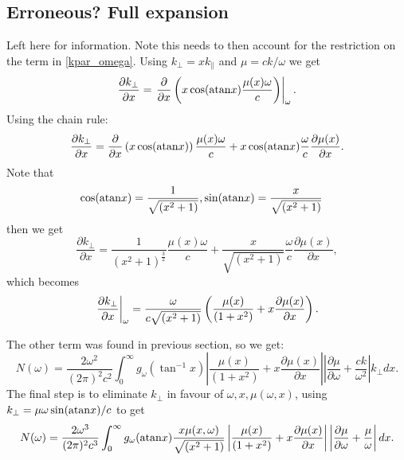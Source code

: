 \documentclass[]{article}
\begin{document}
\subsection{Erroneous? Full expansion}
Left here for information. Note this needs to then account for the restriction on the term in \ref{kpar_omega}. 
Using $k_\perp = x k_\parallel$ and $ \mu = c k /\omega$ we get 
\begin{equation}
\frac{\partial k_\perp}{\partial x} = \left. \frac{\partial}{\partial x} \left( x \cos(\mathrm{atan} x) \frac{\mu(x) \omega}{c}\right)\right|_\omega.
\end{equation}
Using the chain rule:
\begin{equation}
\frac{\partial k_\perp}{\partial x} = \frac{\partial}{\partial x} \left( x \cos(\mathrm{atan} x)\right) \frac{\mu(x) \omega}{c} + x \cos(\mathrm{atan} x)\frac{\omega}{c}\frac{\partial \mu(x)}{\partial x}.
\end{equation}
Note that 
\begin{align}
\cos(\mathrm{atan} x) = \frac{1}{\sqrt{(x^2 + 1)}}, & \sin(\mathrm{atan} x) = \frac{x}{\sqrt{(x^2 + 1)}}
\end{align}
then we get
\begin{equation}
\frac{\partial k_\perp}{\partial x} = \frac{1}{(x^2+1)^\frac{3}{2}} \frac{\mu(x) \omega}{c} +\frac{x}{\sqrt{(x^2+1)}} \frac{\omega}{c}\frac{\partial \mu(x)}{\partial x},
\end{equation}
which becomes
\begin{equation}
\left.\frac{\partial k_\perp}{\partial x}\right|_\omega = \frac{\omega}{c \sqrt{(x^2+1)}}\left( \frac{\mu(x)}{(1+x^2)}  + x \frac{\partial \mu(x)}{\partial x}\right).
\end{equation}

The other term was found in previous section, so we get:
\begin{equation}
N(\omega) = \frac{2  \omega^2}{(2\pi)^2 c^2} \int_0^\infty g_\omega( \tan^{-1} x )
\left| \frac{\mu(x)}{(1+x^2)}  + x \frac{\partial \mu(x)}{\partial x}\right|
\left| \frac{\partial \mu}{\partial \omega} + \frac {ck}{\omega^2}\right|
 k_\perp d x .
\end{equation}
The final step is to eliminate $k_\perp$ in favour of $\omega, x, \mu(\omega, x)$, using $ k_\perp = \mu \omega \sin(\mathrm{atan} x)/c$ to get 
\begin{equation}
N(\omega) = \frac{2  \omega^3}{(2\pi)^2 c^3} \int_0^\infty g_\omega( \mathrm{atan} x ) 
\frac{x \mu(x, \omega)}{\sqrt{(x^2 + 1)}}  \left| \frac{\mu(x)}{(1+x^2)}  + x \frac{\partial \mu(x)}{\partial x}\right|
 \left| \frac{\partial \mu}{\partial \omega} + \frac {\mu}{\omega}\right|
 d x .
\end{equation}
\end{document}

